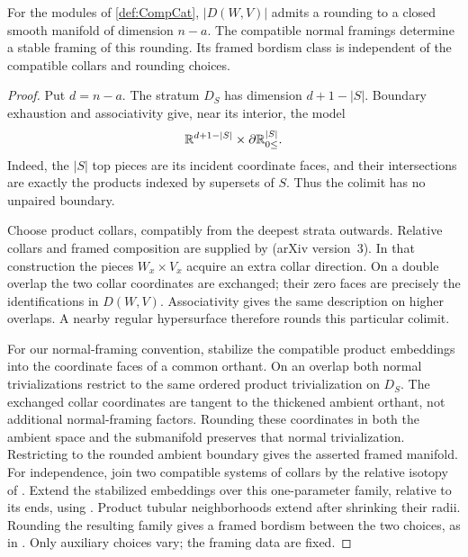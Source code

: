 \begin{lem}\label{lem:colimIsMfld}
    For the modules of \cref{def:CompCat}, $|D(W,V)|$ admits a rounding to a closed smooth manifold of dimension $n-a$. The compatible normal framings determine a stable framing of this rounding. Its framed bordism class is independent of the compatible collars and rounding choices.
\end{lem}
\begin{proof}
    Put $d=n-a$. The stratum $D_S$ has dimension $d+1-|S|$. Boundary exhaustion and associativity give, near its interior, the model
    \[
        \mathbb{R}^{d+1-|S|}\times\partial\mathbb{R}_{0 \leq}^{|S|}.
    \]
    Indeed, the $|S|$ top pieces are its incident coordinate faces, and their intersections are exactly the products indexed by supersets of $S$. Thus the colimit has no unpaired boundary.

    Choose product collars, compatibly from the deepest strata outwards. Relative collars and framed composition are supplied by \cite[Lemmas~3.19, 4.9, and 4.41--4.43]{porcelli2024bordism} (arXiv version~3). In that construction the pieces $W_x\times V_x$ acquire an extra collar direction. On a double overlap the two collar coordinates are exchanged; their zero faces are precisely the identifications in $D(W,V)$. Associativity gives the same description on higher overlaps. A nearby regular hypersurface therefore rounds this particular colimit.

    For our normal-framing convention, stabilize the compatible product embeddings into the coordinate faces of a common orthant. On an overlap both normal trivializations restrict to the same ordered product trivialization on $D_S$. The exchanged collar coordinates are tangent to the thickened ambient orthant, not additional normal-framing factors. Rounding these coordinates in both the ambient space and the submanifold preserves that normal trivialization. Restricting to the rounded ambient boundary gives the asserted framed manifold. For independence, join two compatible systems of collars by the relative isotopy of \cite[Lemmas~3.19 and 4.9]{porcelli2024bordism}. Extend the stabilized embeddings over this one-parameter family, relative to its ends, using \cite[Proposition~2.8]{Genauer12}. Product tubular neighborhoods extend after shrinking their radii. Rounding the resulting family gives a framed bordism between the two choices, as in \cite[Lemmas~4.42--4.43]{porcelli2024bordism}. Only auxiliary choices vary; the framing data are fixed.
\end{proof}


